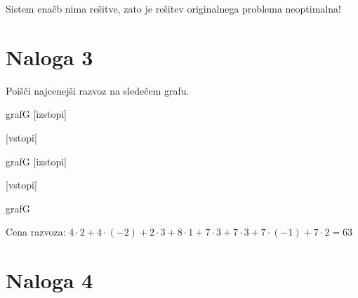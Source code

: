 \documentclass[14pt]{extarticle}
\begin{document}
Sistem enačb nima rešitve, zato je rešitev originalnega problema neoptimalna!

\clearpage

\section*{Naloga 3}

Poišči najcenejši razvoz na sledečem grafu.

\begin{razvoz}[scale=0.9]{grafG}
    [izstopi]


    [vstopi]
\end{razvoz}

\begin{razvoz}[scale=0.9]{grafG}
    [izstopi]


    [vstopi]
\end{razvoz}

\begin{razvoz}[scale=0.9]{grafG}


\end{razvoz}

Cena razvoza: $4 \cdot 2 + 4 \cdot (-2) + 2 \cdot 3 + 8 \cdot 1 + 7 \cdot 3 + 7 \cdot 3 + 7 \cdot (-1) + 7 \cdot 2 = 63$

\clearpage

\section*{Naloga 4}
\end{document}
